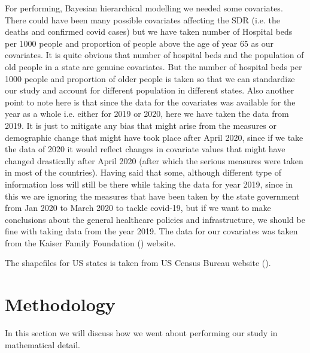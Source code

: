 \documentclass[enabledeprecatedfontcommands,parskip=half,twoside=semi,BCOR=0mm]{scrreprt}
\numberwithin{equation}{chapter}
\theoremstyle{definition}
\theoremstyle{remark}
\begin{document}
    For performing, Bayesian  hierarchical modelling we needed some covariates. There could have been many possible covariates affecting the SDR (i.e. the deaths and confirmed covid cases) but we have taken number of Hospital beds per 1000 people and proportion of people above the age of year 65 as our covariates. It is quite obvious that number of hospital beds and the population of old people in a state are genuine covariates. But the number of hospital beds per 1000 people and  proportion of older people is taken so that we can standardize our study and account for different population in different states. Also another point to note here is that since the data for the covariates was available for the year as a whole i.e. either for 2019 or 2020, here we have taken the data from 2019. It is just to mitigate any bias that might arise from the measures or demographic change that might have took place after April 2020, since if we take the data of 2020 it would reflect changes in covariate values that might have changed drastically after April 2020 (after which the serious measures were taken in most of the countries). Having said that some, although different type of information loss will still be there while taking the data for year 2019, since in this we are ignoring the measures that have been taken by the state government from Jan 2020 to March 2020 to tackle covid-19, but if we want to make conclusions about the general healthcare policies and infrastructure, we should be fine with taking data from the year 2019. The data for our covariates was taken from the Kaiser Family Foundation (\cite{KFF}) website.

    The shapefiles for US states is taken from US Census Bureau website (\cite{USBC}).
    \chapter{Methodology}
    In this section we will discuss how we went about performing our study in mathematical detail. 
\end{document}
